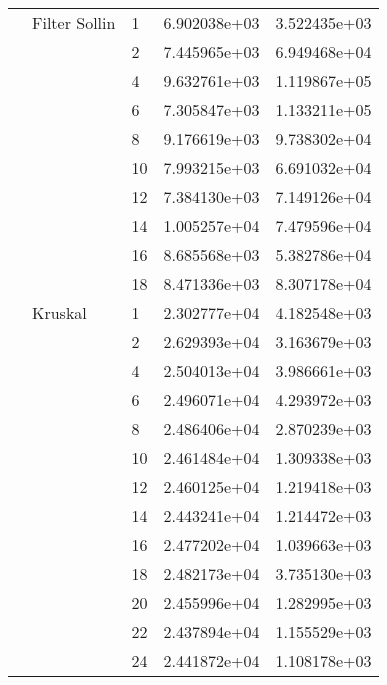 \begin{tabular}{lllrr}
                      & Filter Sollin & 1  &  6.902038e+03 &  3.522435e+03 \\
                      &            & 2  &  7.445965e+03 &  6.949468e+04 \\
                      &            & 4  &  9.632761e+03 &  1.119867e+05 \\
                      &            & 6  &  7.305847e+03 &  1.133211e+05 \\
                      &            & 8  &  9.176619e+03 &  9.738302e+04 \\
                      &            & 10 &  7.993215e+03 &  6.691032e+04 \\
                      &            & 12 &  7.384130e+03 &  7.149126e+04 \\
                      &            & 14 &  1.005257e+04 &  7.479596e+04 \\
                      &            & 16 &  8.685568e+03 &  5.382786e+04 \\
                      &            & 18 &  8.471336e+03 &  8.307178e+04 \\
                      & Kruskal & 1  &  2.302777e+04 &  4.182548e+03 \\
                      &            & 2  &  2.629393e+04 &  3.163679e+03 \\
                      &            & 4  &  2.504013e+04 &  3.986661e+03 \\
                      &            & 6  &  2.496071e+04 &  4.293972e+03 \\
                      &            & 8  &  2.486406e+04 &  2.870239e+03 \\
                      &            & 10 &  2.461484e+04 &  1.309338e+03 \\
                      &            & 12 &  2.460125e+04 &  1.219418e+03 \\
                      &            & 14 &  2.443241e+04 &  1.214472e+03 \\
                      &            & 16 &  2.477202e+04 &  1.039663e+03 \\
                      &            & 18 &  2.482173e+04 &  3.735130e+03 \\
                      &            & 20 &  2.455996e+04 &  1.282995e+03 \\
                      &            & 22 &  2.437894e+04 &  1.155529e+03 \\
                      &            & 24 &  2.441872e+04 &  1.108178e+03 \\

\end{tabular}
